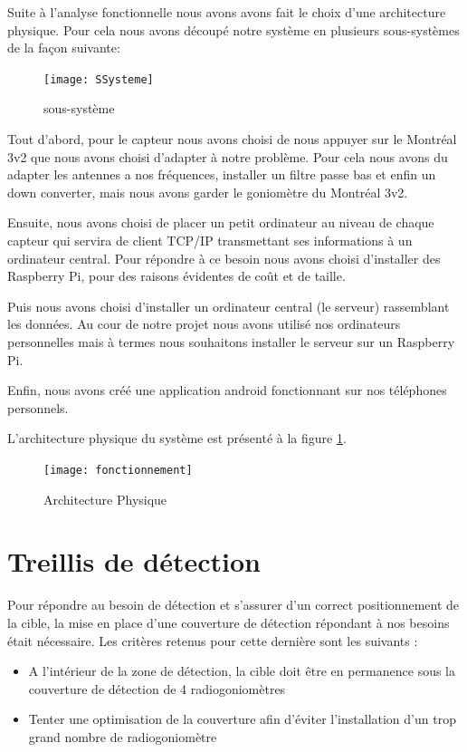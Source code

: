 Suite à l'analyse fonctionnelle nous avons avons fait le choix d'une architecture physique.
Pour cela nous avons découpé notre système en plusieurs sous-systèmes de la façon suivante:

\begin{figure}[h]
  \centering
  \texttt{[image: SSysteme]}
  \caption{sous-système}
\end{figure}

Tout d'abord, pour le capteur nous avons choisi de nous appuyer sur le Montréal 3v2 que nous avons choisi d'adapter à notre problème. Pour cela nous avons du adapter les antennes a nos fréquences, installer un filtre passe bas et enfin un down converter, mais nous avons garder le goniomètre du Montréal 3v2.

Ensuite, nous avons choisi de placer un petit ordinateur au niveau de chaque capteur qui servira de client TCP/IP transmettant ses informations à un ordinateur central. Pour répondre à ce besoin nous avons choisi d'installer des Raspberry Pi, pour des raisons évidentes de coût et de taille.

Puis nous avons choisi d'installer un ordinateur central (le serveur) rassemblant les données. Au cour de notre projet nous avons utilisé nos ordinateurs personnelles mais à termes nous souhaitons installer le serveur sur un Raspberry Pi.

Enfin, nous avons créé une application android fonctionnant sur nos téléphones personnels.


L'architecture physique du système est présenté à la figure \ref{fig:arch_phys}.

\begin{figure}[h]
  \centering
  \texttt{[image: fonctionnement]}
  \caption{Architecture Physique}
  \label{fig:arch_phys}
\end{figure}
\newpage

\newpage
\section{Treillis de détection}

Pour répondre au besoin de détection et s’assurer d’un correct positionnement de la cible, la mise en
place d’une couverture de détection répondant à nos besoins était nécessaire. Les critères retenus
pour cette dernière sont les suivants :

\begin{itemize}
\item A l’intérieur de la zone de détection, la cible doit être en permanence sous la couverture de détection de 4 radiogoniomètres
\item Tenter une optimisation de la couverture afin d’éviter l’installation d’un trop grand
nombre de radiogoniomètre
\end{itemize}


